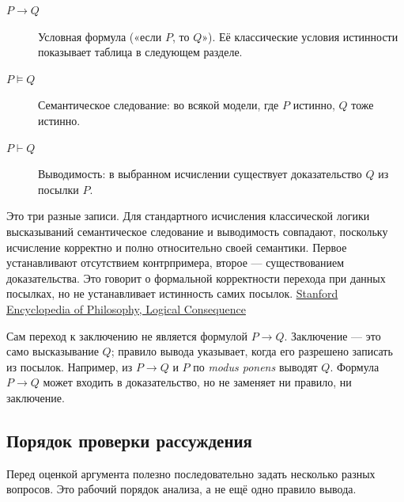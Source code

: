 \documentclass[12pt,a4paper]{article}
\begin{document}
\begin{description}
\item[\(P\to Q\)] Условная формула («если \(P\), то \(Q\)»). Её классические условия истинности показывает таблица в следующем разделе.
\item[\(P\models Q\)] Семантическое следование: во всякой модели, где \(P\) истинно, \(Q\) тоже истинно.
\item[\(P\vdash Q\)] Выводимость: в выбранном исчислении существует доказательство \(Q\) из посылки \(P\).
\end{description}
Это три разные записи. Для стандартного исчисления классической логики высказываний семантическое следование и выводимость совпадают, поскольку исчисление корректно и полно относительно своей семантики. Первое устанавливают отсутствием контрпримера, второе — существованием доказательства. Это говорит о формальной корректности перехода при данных посылках, но не устанавливает истинность самих посылок. \href{https://plato.stanford.edu/entries/logical-consequence/}{Stanford Encyclopedia of Philosophy, Logical Consequence}

Сам переход к заключению не является формулой \(P\to Q\). Заключение — это само высказывание \(Q\); правило вывода указывает, когда его разрешено записать из посылок. Например, из \(P\to Q\) и \(P\) по \emph{modus ponens} выводят \(Q\). Формула \(P\to Q\) может входить в доказательство, но не заменяет ни правило, ни заключение.

\subsection{Порядок проверки рассуждения}

Перед оценкой аргумента полезно последовательно задать несколько разных вопросов. Это рабочий порядок анализа, а не ещё одно правило вывода.
\end{document}
